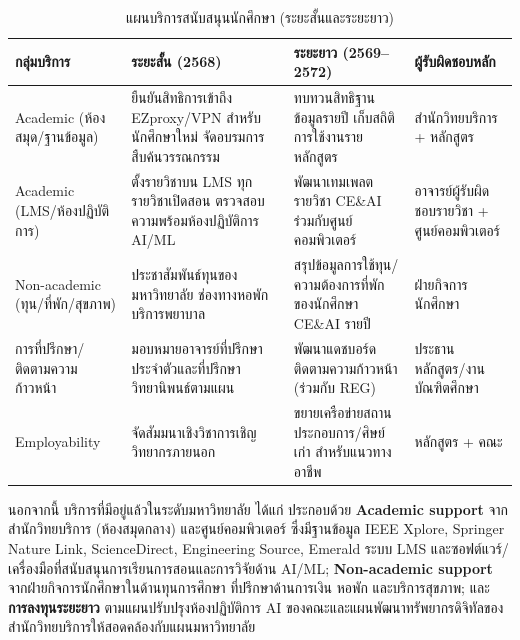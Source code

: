 \begin{table}[H]
  \centering
  \caption{แผนบริการสนับสนุนนักศึกษา (ระยะสั้นและระยะยาว)}
  \label{tbl:c6_support_plan}
  \begingroup
  \small
  \setlength{\tabcolsep}{3pt}
  \renewcommand{\arraystretch}{1.25}
  \begin{tabularx}{\linewidth}{|>{\raggedright\arraybackslash}p{2.8cm}|Y|>{\raggedright\arraybackslash}p{3.0cm}|>{\raggedright\arraybackslash}p{2.6cm}|}
    \hline
    \textbf{กลุ่มบริการ} & \textbf{ระยะสั้น (2568)} & \textbf{ระยะยาว (2569--2572)} & \textbf{ผู้รับผิดชอบหลัก} \\
    \hline
    Academic (ห้องสมุด/ฐานข้อมูล) & ยืนยันสิทธิการเข้าถึง EZproxy/VPN สำหรับนักศึกษาใหม่ จัดอบรมการสืบค้นวรรณกรรม & ทบทวนสิทธิฐานข้อมูลรายปี เก็บสถิติการใช้งานรายหลักสูตร & สำนักวิทยบริการ + หลักสูตร \\
    \hline
    Academic (LMS/ห้องปฏิบัติการ) & ตั้งรายวิชาบน LMS ทุกรายวิชาเปิดสอน ตรวจสอบความพร้อมห้องปฏิบัติการ AI/ML & พัฒนาเทมเพลตรายวิชา CE\&AI ร่วมกับศูนย์คอมพิวเตอร์ & อาจารย์ผู้รับผิดชอบรายวิชา + ศูนย์คอมพิวเตอร์ \\
    \hline
    Non-academic (ทุน/ที่พัก/สุขภาพ) & ประชาสัมพันธ์ทุนของมหาวิทยาลัย ช่องทางหอพัก บริการพยาบาล & สรุปข้อมูลการใช้ทุน/ความต้องการที่พักของนักศึกษา CE\&AI รายปี & ฝ่ายกิจการนักศึกษา \\
    \hline
    การที่ปรึกษา/ติดตามความก้าวหน้า & มอบหมายอาจารย์ที่ปรึกษาประจำตัวและที่ปรึกษาวิทยานิพนธ์ตามแผน & พัฒนาแดชบอร์ดติดตามความก้าวหน้า (ร่วมกับ REG) & ประธานหลักสูตร/งานบัณฑิตศึกษา \\
    \hline
    Employability & จัดสัมมนาเชิงวิชาการเชิญวิทยากรภายนอก & ขยายเครือข่ายสถานประกอบการ/ศิษย์เก่า สำหรับแนวทางอาชีพ & หลักสูตร + คณะ \\
    \hline
  \end{tabularx}
  \endgroup
\end{table}

นอกจากนี้ บริการที่มีอยู่แล้วในระดับมหาวิทยาลัย ได้แก่
ประกอบด้วย \textbf{Academic support} จากสำนักวิทยบริการ (ห้องสมุดกลาง) และศูนย์คอมพิวเตอร์ ซึ่งมีฐานข้อมูล IEEE Xplore, Springer Nature Link, ScienceDirect, Engineering Source, Emerald ระบบ LMS และซอฟต์แวร์/เครื่องมือที่สนับสนุนการเรียนการสอนและการวิจัยด้าน AI/ML; \textbf{Non-academic support} จากฝ่ายกิจการนักศึกษาในด้านทุนการศึกษา ที่ปรึกษาด้านการเงิน หอพัก และบริการสุขภาพ; และ \textbf{การลงทุนระยะยาว} ตามแผนปรับปรุงห้องปฏิบัติการ AI ของคณะและแผนพัฒนาทรัพยากรดิจิทัลของสำนักวิทยบริการให้สอดคล้องกับแผนมหาวิทยาลัย


